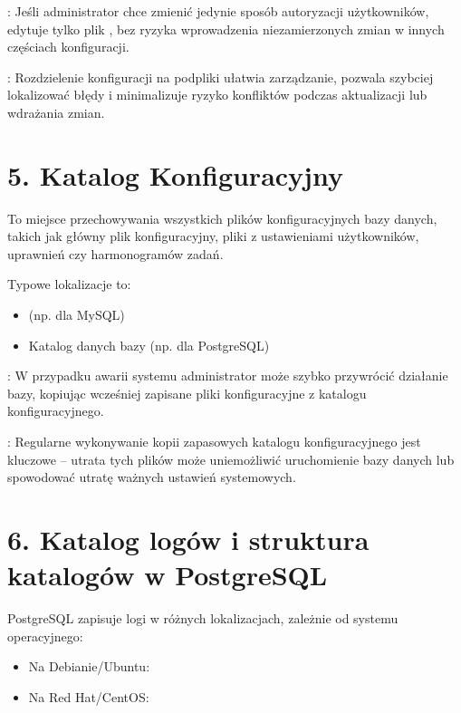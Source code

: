 \documentclass[a4paper,11pt,polish]{sphinxmanual}
\begin{document}
\sphinxAtStartPar
{}: Jeśli administrator chce zmienić jedynie sposób autoryzacji użytkowników, edytuje tylko plik , bez ryzyka wprowadzenia niezamierzonych zmian w innych częściach konfiguracji.

\sphinxAtStartPar
{}: Rozdzielenie konfiguracji na podpliki ułatwia zarządzanie, pozwala szybciej lokalizować błędy i minimalizuje ryzyko konfliktów podczas aktualizacji lub wdrażania zmian.


\section{5. Katalog Konfiguracyjny}
\label{\detokenize{Konfiguracja_baz_danych/Konfiguracja_baz_danych:katalog-konfiguracyjny}}
\sphinxAtStartPar
To miejsce przechowywania wszystkich plików konfiguracyjnych bazy danych, takich jak główny plik konfiguracyjny, pliki z ustawieniami użytkowników, uprawnień czy harmonogramów zadań.

\sphinxAtStartPar
Typowe lokalizacje to:
\begin{itemize}
\item {} 
\sphinxAtStartPar
{} (np.  dla MySQL)

\item {} 
\sphinxAtStartPar
Katalog danych bazy (np.  dla PostgreSQL)

\end{itemize}

\sphinxAtStartPar
{}: W przypadku awarii systemu administrator może szybko przywrócić działanie bazy, kopiując wcześniej zapisane pliki konfiguracyjne z katalogu konfiguracyjnego.

\sphinxAtStartPar
{}: Regularne wykonywanie kopii zapasowych katalogu konfiguracyjnego jest kluczowe – utrata tych plików może uniemożliwić uruchomienie bazy danych lub spowodować utratę ważnych ustawień systemowych.


\section{6. Katalog logów i struktura katalogów w PostgreSQL}
\label{\detokenize{Konfiguracja_baz_danych/Konfiguracja_baz_danych:katalog-logow-i-struktura-katalogow-w-postgresql}}
\sphinxAtStartPar
{}
PostgreSQL zapisuje logi w różnych lokalizacjach, zależnie od systemu operacyjnego:
\begin{itemize}
\item {} 
\sphinxAtStartPar
Na Debianie/Ubuntu: 

\item {} 
\sphinxAtStartPar
Na Red Hat/CentOS: 

\end{itemize}
\end{document}
